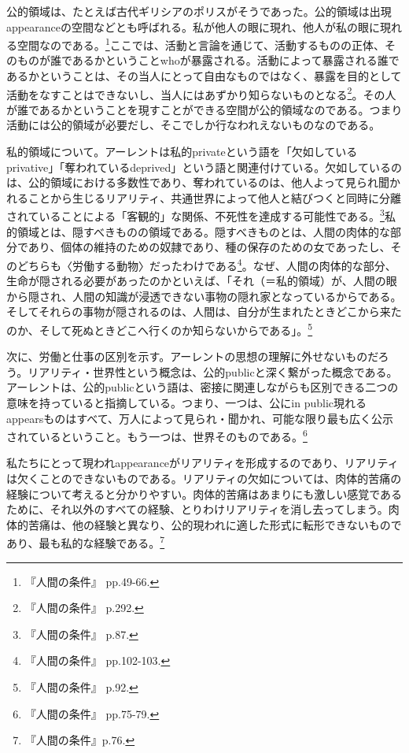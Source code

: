 \documentclass[b5j,twoside,twocolumn]{utarticle}
\begin{document}
公的領域は、たとえば古代ギリシアのポリスがそうであった。公的領域は出現appearanceの空間などとも呼ばれる。私が他人の眼に現れ、他人が私の眼に現れる空間なのである。\footnote{『人間の条件』 pp.49-66.}ここでは、活動と言論を通じて、活動するものの正体、そのものが誰であるかということwhoが暴露される。活動によって暴露される誰であるかということは、その当人にとって自由なものではなく、暴露を目的として活動をなすことはできないし、当人にはあずかり知らないものとなる\footnote{『人間の条件』 p.292.}。その人が誰であるかということを現すことができる空間が公的領域なのである。つまり活動には公的領域が必要だし、そこでしか行なわれえないものなのである。


私的領域について。アーレントは私的privateという語を「欠如しているprivative」「奪われているdeprived」という語と関連付けている。欠如しているのは、公的領域における多数性であり、奪われているのは、他人よって見られ聞かれることから生じるリアリティ、共通世界によって他人と結びつくと同時に分離されていることによる「客観的」な関係、不死性を達成する可能性である。\footnote{『人間の条件』 p.87.}私的領域とは、隠すべきものの領域である。隠すべきものとは、人間の肉体的な部分であり、個体の維持のための奴隷であり、種の保存のための女であったし、そのどちらも〈労働する動物〉だったわけである\footnote{『人間の条件』 pp.102-103.}。なぜ、人間の肉体的な部分、生命が隠される必要があったのかといえば、「それ（＝私的領域）が、人間の眼から隠され、人間の知識が浸透できない事物の隠れ家となっているからである。そしてそれらの事物が隠されるのは、人間は、自分が生まれたときどこから来たのか、そして死ぬときどこへ行くのか知らないからである」。\footnote{『人間の条件』 p.92.}


次に、労働と仕事の区別を示す。アーレントの思想の理解に外せないものだろう。リアリティ・世界性という概念は、公的publicと深く繋がった概念である。アーレントは、公的publicという語は、密接に関連しながらも区別できる二つの意味を持っていると指摘している。つまり、一つは、公にin public現れるappearsものはすべて、万人によって見られ・聞かれ、可能な限り最も広く公示されているということ。もう一つは、世界そのものである。\footnote{『人間の条件』 pp.75-79.}


私たちにとって現われappearanceがリアリティを形成するのであり、リアリティは欠くことのできないものである。リアリティの欠如については、肉体的苦痛の経験について考えると分かりやすい。肉体的苦痛はあまりにも激しい感覚であるために、それ以外のすべての経験、とりわけリアリティを消し去ってしまう。肉体的苦痛は、他の経験と異なり、公的現われに適した形式に転形できないものであり、最も私的な経験である。\footnote{『人間の条件』p.76.}
\end{document}
